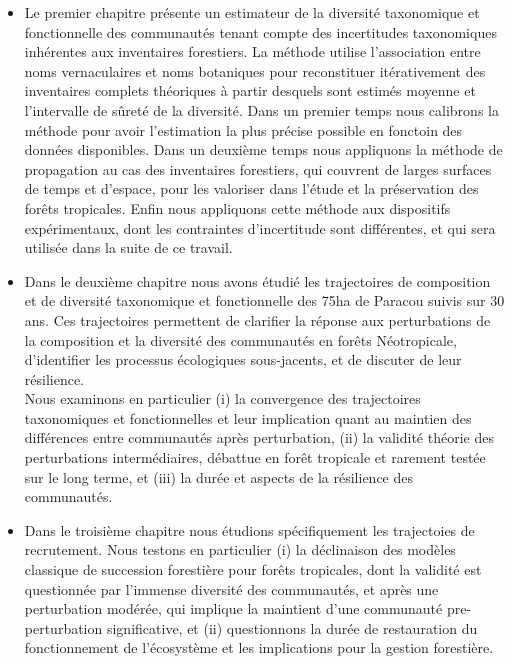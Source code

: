 \documentclass[
  11pt,
  french,
  A4paper,
  extrafontsizes,onecolumn,openright
  ]{memoir}
\begin{document}
\begin{itemize}
\item
  Le premier chapitre présente un estimateur de la diversité taxonomique
  et fonctionnelle des communautés tenant compte des incertitudes
  taxonomiques inhérentes aux inventaires forestiers. La méthode utilise
  l'association entre noms vernaculaires et noms botaniques pour
  reconstituer itérativement des inventaires complets théoriques à
  partir desquels sont estimés moyenne et l'intervalle de sûreté de la
  diversité. Dans un premier temps nous calibrons la méthode pour avoir
  l'estimation la plus précise possible en fonctoin des données
  disponibles. Dans un deuxième temps nous appliquons la méthode de
  propagation au cas des inventaires forestiers, qui couvrent de larges
  surfaces de temps et d'espace, pour les valoriser dans l'étude et la
  préservation des forêts tropicales. Enfin nous appliquons cette
  méthode aux dispositifs expérimentaux, dont les contraintes
  d'incertitude sont différentes, et qui sera utilisée dans la suite de
  ce travail.
\item
  Dans le deuxième chapitre nous avons étudié les trajectoires de
  composition et de diversité taxonomique et fonctionnelle des 75ha de
  Paracou suivis sur 30 ans. Ces trajectoires permettent de clarifier la
  réponse aux perturbations de la composition et la diversité des
  communautés en forêts Néotropicale, d'identifier les processus
  écologiques sous-jacents, et de discuter de leur résilience.\\
  Nous examinons en particulier (i) la convergence des trajectoires
  taxonomiques et fonctionnelles et leur implication quant au maintien
  des différences entre communautés après perturbation, (ii) la validité
  théorie des perturbations intermédiaires, débattue en forêt tropicale
  et rarement testée sur le long terme, et (iii) la durée et aspects de
  la résilience des communautés.
\item
  Dans le troisième chapitre nous étudions spécifiquement les
  trajectoies de recrutement. Nous testons en particulier (i) la
  déclinaison des modèles classique de succession forestière pour forêts
  tropicales, dont la validité est questionnée par l'immense diversité
  des communautés, et après une perturbation modérée, qui implique la
  maintient d'une communauté pre-perturbation significative, et (ii)
  questionnons la durée de restauration du fonctionnement de
  l'écosystème et les implications pour la gestion forestière.
\end{itemize}
\end{document}

